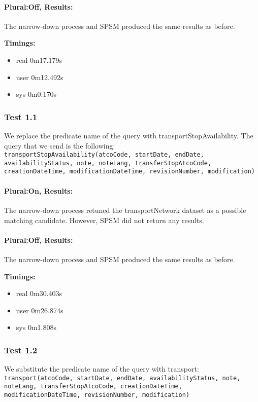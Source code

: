 \documentclass[a4paper,10pt]{article}
\begin{document}
\paragraph{Plural:Off, Results: } The narrow-down process and SPSM produced the same results as before.


\textbf{Timings:}
\begin{itemize}
\item real	0m17.179s
\item user	0m12.492s
\item sys	0m0.170s

\end{itemize}

\subsubsection{Test 1.1}
We replace the predicate name of the query with transportStopAvailability. 
The query that we send is the following: \\
\indent \texttt{transportStopAvailability(atcoCode,	startDate,	endDate,	availabilityStatus,	note,	noteLang,	transferStopAtcoCode,	creationDateTime,	modificationDateTime,	revisionNumber,	modification)}


\paragraph{Plural:On, Results:} The narrow-down process retuned the transportNetwork dataset as a possible matching candidate. However, SPSM
 did not return any results. 
\paragraph{Plural:Off, Results:} The narrow-down process and SPSM produced the same results as before.

\textbf{Timings:}
\begin{itemize}
\item real	0m30.403s
\item user	0m26.874s
\item sys	0m1.808s

\end{itemize}
 \subsubsection{Test 1.2}
We substitute the predicate name of the query with transport:\\
\indent \texttt{transport(atcoCode,	startDate,	endDate,	availabilityStatus,	note,	noteLang,	transferStopAtcoCode,	creationDateTime,	modificationDateTime,	revisionNumber,	modification)}
\end{document}

